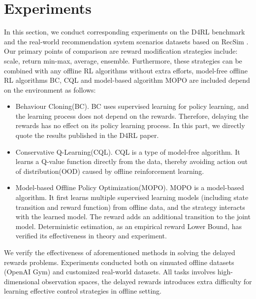 \section{Experiments}

In this section, we conduct corresponding experiments on the D4RL benchmark \cite{fuD4RLDatasetsDeep2021} and the real-world recommendation system scenarios datasets based on RecSim \cite{ieRecSimConfigurableSimulation2019}. Our primary points of comparison are reward modification strategies include: scale, return min-max, average, ensemble. Furthermore, these strategies can be combined with any offline RL algorithms without extra efforts, model-free offline RL algorithms BC, CQL \cite{kumarConservativeQLearningOffline2020} and model-based algorithm MOPO \cite{yuMOPOModelbasedOffline2020} are included depend on the environment as follows:

\begin{itemize}
    \item Behaviour Cloning(BC). BC uses supervised learning for policy learning, and the learning process does not depend on the rewards. Therefore, delaying the rewards has no effect on its policy learning process. In this part, we directly quote the results published in the D4RL paper.
    
    \item Conservative Q-Learning(CQL). CQL is a type of model-free algorithm. It learns a Q-value function directly from the data, thereby avoiding action out of distribution(OOD) caused by offline reinforcement learning.
    
    \item Model-based Offline Policy Optimization(MOPO). MOPO is a model-based algorithm. It first learns multiple supervised learning models (including state transition and reward function) from offline data, and the strategy interacts with the learned model. The reward adds an additional transition to the joint model. Deterministic estimation, as an empirical reward Lower Bound, has verified its effectiveness in theory and experiment.
    
\end{itemize}

We verify the effectiveness of aforementioned methods in solving the delayed rewards problems. Experiments conducted both on simuated offline datasets (OpenAI Gym) and customized real-world datasets. All tasks involves  high-dimensional observation spaces, the delayed rewards introduces extra difficulty for learning effective control strategies in offline setting.

